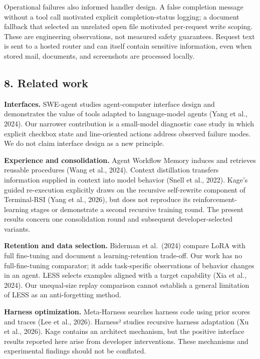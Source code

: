 \documentclass[
  10pt,
]{article}
\begin{document}
Operational failures also informed handler design. A false completion
message without a tool call motivated explicit completion-status
logging; a document fallback that selected an unrelated open file
motivated per-request write scoping. These are engineering observations,
not measured safety guarantees. Request text is sent to a hosted router
and can itself contain sensitive information, even when stored mail,
documents, and screenshots are processed locally.

\subsection{8. Related work}\label{related-work}

\textbf{Interfaces.} SWE-agent studies agent-computer interface design
and demonstrates the value of tools adapted to language-model agents
(Yang et al., 2024). Our narrower contribution is a small-model
diagnostic case study in which explicit checkbox state and line-oriented
actions address observed failure modes. We do not claim interface design
as a new principle.

\textbf{Experience and consolidation.} Agent Workflow Memory induces and
retrieves reusable procedures (Wang et al., 2024). Context distillation
transfers information supplied in context into model behavior (Snell et
al., 2022). Kage's guided re-execution explicitly draws on the recursive
self-rewrite component of Terminal-RSI (Yang et al., 2026), but does not
reproduce its reinforcement-learning stages or demonstrate a second
recursive training round. The present results concern one consolidation
round and subsequent developer-selected variants.

\textbf{Retention and data selection.} Biderman et al.~(2024) compare
LoRA with full fine-tuning and document a learning-retention trade-off.
Our work has no full-fine-tuning comparator; it adds task-specific
observations of behavior changes in an agent. LESS selects examples
aligned with a target capability (Xia et al., 2024). Our unequal-size
replay comparison cannot establish a general limitation of LESS as an
anti-forgetting method.

\textbf{Harness optimization.} Meta-Harness searches harness code using
prior scores and traces (Lee et al., 2026). Harness² studies recursive
harness adaptation (Xu et al., 2026). Kage contains an architect
mechanism, but the positive interface results reported here arise from
developer interventions. These mechanisms and experimental findings
should not be conflated.
\end{document}
